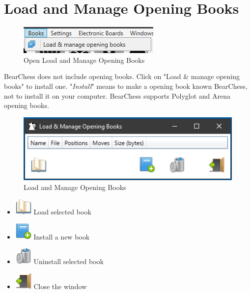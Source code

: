 \documentclass[11pt,a4paper]{article}
\begin{document}
\section{Load and Manage Opening Books} \label{OpeningBooks}

\begin{figure}[H]
	\centering
	\includegraphics[scale=1.0]{books.png}
	\caption{Open Load and Manage Opening Books  }
	\label{fig:LoadManageBooks1}
\end{figure}

BearChess does not include opening books. Click on "Load \& manage opening books" to install one. "\textit{Install}" means to make a opening book known BearChess, not to install it on your computer. BearChess supports Polyglot and Arena opening books.\\

\begin{figure}[H]
	\centering
	\includegraphics[scale=1.0]{LoadManageBooks2.png}
	\caption{Load and Manage Opening Books  }
	\label{fig:LoadManageBooks2}
\end{figure}

\begin{itemize}
	\item \includegraphics[scale=0.5]{book_open.png} Load selected book
	\item \includegraphics[scale=0.5]{book_add.png} Install a new book
	\item \includegraphics[scale=0.5]{bin.png} Uninstall selected book
	\item \includegraphics[scale=0.5]{door_out.png} Close the window
\end{itemize}
\end{document}

